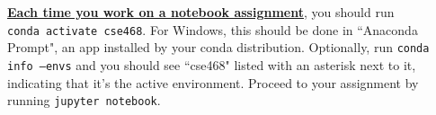 \documentclass[12pt]{article}
\begin{document}
\textbf{\underline{Each time you work on a notebook assignment}}, you should run \\ \texttt{conda activate cse468}. For Windows, this should be done in ``Anaconda Prompt", an app installed by your conda distribution. Optionally, run \texttt{conda info --envs} and you should see ``cse468" listed with an asterisk next to it, indicating that it's the active environment. Proceed to your assignment by running \texttt{jupyter notebook}.




\newpage
\end{document}
